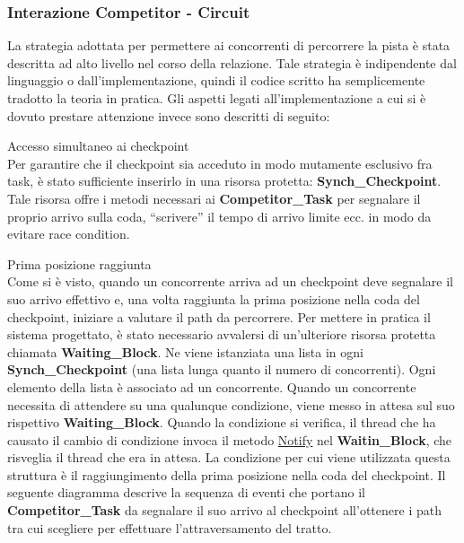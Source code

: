 \subsubsection{Interazione Competitor - Circuit}
La strategia adottata per permettere ai concorrenti di percorrere la pista \`{e} stata descritta ad alto livello nel corso della relazione.
Tale strategia \`{e} indipendente dal linguaggio o dall'implementazione, quindi il codice scritto ha semplicemente tradotto la teoria in pratica.
Gli aspetti legati all'implementazione a cui si \`{e} dovuto prestare attenzione invece sono descritti di seguito:
\begin{description}
\item{Accesso simultaneo ai checkpoint}\\
Per garantire che il checkpoint sia acceduto in modo mutamente esclusivo fra task, \`{e} stato sufficiente inserirlo in una risorsa protetta:
\textbf{Synch\_Checkpoint}. Tale risorsa offre i metodi necessari ai \textbf{Competitor\_Task} per segnalare il proprio arrivo sulla coda,
``scrivere'' il tempo di arrivo limite ecc. in modo da evitare race condition.
\item{Prima posizione raggiunta}\\
Come si \`{e} visto, quando un concorrente arriva ad un checkpoint deve segnalare il suo arrivo effettivo e, una volta raggiunta la prima posizione
nella coda del checkpoint, iniziare a valutare il path da percorrere. Per mettere in pratica il sistema progettato, \`{e} stato necessario avvalersi
di un'ulteriore risorsa protetta chiamata \textbf{Waiting\_Block}. Ne viene istanziata una lista in ogni \textbf{Synch\_Checkpoint} (una lista
lunga quanto il numero di concorrenti). Ogni elemento della lista \`{e} associato ad un concorrente. 
Quando un concorrente necessita di attendere su una qualunque condizione, viene messo in attesa
sul suo rispettivo \textbf{Waiting\_Block}. Quando la condizione si verifica, il thread che ha causato il cambio
di condizione invoca il metodo \underline{Notify} nel \textbf{Waitin\_Block}, che risveglia il thread che era in attesa.
La condizione per cui viene utilizzata questa struttura \`{e} il raggiungimento della prima posizione nella coda del checkpoint. Il seguente diagramma
descrive la sequenza di eventi che portano il \textbf{Competitor\_Task} da segnalare il suo arrivo al checkpoint all'ottenere i path tra cui
scegliere per effettuare l'attraversamento del tratto.
\begin{center}
\begin{figure}[h!]

\end{figure}
\end{center}
\end{description}
